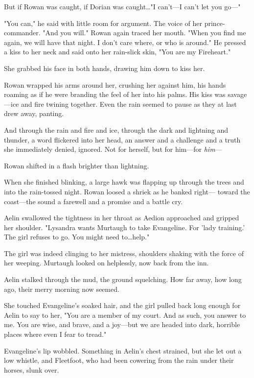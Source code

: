But if Rowan was caught, if Dorian was caught\ldots "I can't---I can't let you go---"

"You can," he said with little room for argument.
The voice of her prince-commander.
"And you will."
Rowan again traced her mouth.
"When you find me again, we will have that night.
I don't care where, or who is around."
He pressed a kiss to her neck and said onto her rain-slick skin, "You are my Fireheart."

She grabbed his face in both hands, drawing him down to kiss her.

Rowan wrapped his arms around her, crushing her against him, his hands roaming as if he were branding the feel of her into his palms.
His kiss was savage---ice and fire twining together.
Even the rain seemed to pause as they at last drew away, panting.

And through the rain and fire and ice, through the dark and lightning and thunder, a word flickered into her head, an answer and a challenge and a truth she immediately denied, ignored.
Not for herself, but for him---for \emph{him}--- 

Rowan shifted in a flash brighter than lightning.

When she finished blinking, a large hawk was flapping up through the trees and into the rain-tossed night.
Rowan loosed a shriek as he banked right--- toward the coast---the sound a farewell and a promise and a battle cry.

Aelin swallowed the tightness in her throat as Aedion approached and gripped her shoulder.
"Lysandra wants Murtaugh to take Evangeline.
For 'lady training.'
The girl refuses to go.
You might need to\ldots help."

The girl was indeed clinging to her mistress, shoulders shaking with the force of her weeping.
Murtaugh looked on helplessly, now back from the inn.

Aelin stalked through the mud, the ground squelching.
How far away, how long ago, their merry morning now seemed.

She touched Evangeline's soaked hair, and the girl pulled back long enough for Aelin to say to her, "You are a member of my court.
And as such, you answer to me.
You are wise, and brave, and a joy---but we are headed into dark, horrible places where even I fear to tread."

Evangeline's lip wobbled.
Something in Aelin's chest strained, but she let out a low whistle, and Fleetfoot, who had been cowering from the rain under their horses, slunk over.

